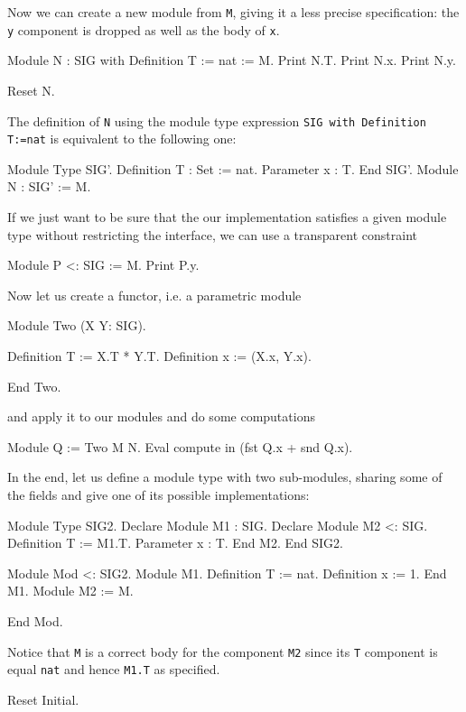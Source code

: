 Now we can create a new module from \texttt{M}, giving it a less
precise specification: the \texttt{y} component is dropped as well
as the body of \texttt{x}.

\begin{coq_example}
Module N  :  SIG with Definition T := nat  :=  M.
Print N.T.
Print N.x.
Print N.y.
\end{coq_example}
\begin{coq_eval}
Reset N.
\end{coq_eval}

\noindent
The definition of \texttt{N} using the module type expression
\texttt{SIG with Definition T:=nat} is equivalent to the following
one:

\begin{coq_example*}
Module Type SIG'.
  Definition T : Set := nat.
  Parameter x : T.
End SIG'.
Module N : SIG' := M.
\end{coq_example*}
If we just want to be sure that the our implementation satisfies a
given module type without restricting the interface, we can use a
transparent constraint
\begin{coq_example}
Module P <: SIG := M.
Print P.y.
\end{coq_example}
Now let us create a functor, i.e. a parametric module
\begin{coq_example}
Module Two (X Y: SIG).
\end{coq_example}
\begin{coq_example*}
  Definition T := X.T * Y.T.
  Definition x := (X.x, Y.x).
\end{coq_example*}
\begin{coq_example}
End Two.
\end{coq_example}
and apply it to our modules and do some computations
\begin{coq_example}
Module Q := Two M N.
Eval compute in (fst Q.x + snd Q.x).
\end{coq_example}
In the end, let us define a module type with two sub-modules, sharing
some of the fields and give one of its possible implementations:
\begin{coq_example}
Module Type SIG2.
  Declare Module M1 : SIG.
  Declare Module M2 <: SIG.
    Definition T := M1.T.
    Parameter x : T.
  End M2.
End SIG2.
\end{coq_example}
\begin{coq_example*}
Module Mod <: SIG2.
  Module M1.
    Definition T := nat.
    Definition x := 1.
  End M1.
  Module M2 := M.
\end{coq_example*}
\begin{coq_example}
End Mod.
\end{coq_example}
Notice that \texttt{M} is a correct body for the component \texttt{M2}
since its \texttt{T} component is equal \texttt{nat} and hence
\texttt{M1.T} as specified.
\begin{coq_eval}
Reset Initial.
\end{coq_eval}

